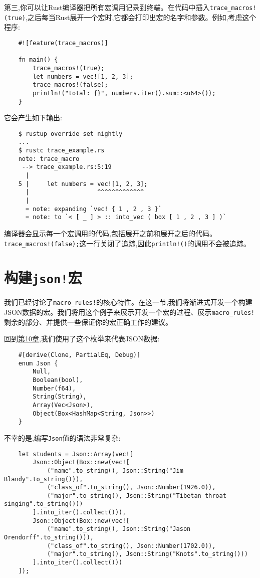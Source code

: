 第三,你可以让Rust编译器把所有宏调用记录到终端。在代码中插入\texttt{trace\_macros!(true)},之后每当Rust展开一个宏时,它都会打印出宏的名字和参数。例如,考虑这个程序:
\begin{verbatim}
    #![feature(trace_macros)]

    fn main() {
        trace_macros!(true);
        let numbers = vec![1, 2, 3];
        trace_macros!(false);
        println!("total: {}", numbers.iter().sum::<u64>());
    }
\end{verbatim}

它会产生如下输出:
\begin{verbatim}
    $ rustup override set nightly
    ...
    $ rustc trace_example.rs
    note: trace_macro
     --> trace_example.rs:5:19
      |
    5 |     let numbers = vec![1, 2, 3];
      |                   ^^^^^^^^^^^^^
      |
      = note: expanding `vec! { 1 , 2 , 3 }`
      = note: to `< [ _ ] > :: into_vec ( box [ 1 , 2 , 3 ] )`
\end{verbatim}
编译器会显示每一个宏调用的代码,包括展开之前和展开之后的代码。\texttt{trace\_macros!(false);}这一行关闭了追踪,因此\texttt{println!()}的调用不会被追踪。

\section{构建\texttt{json!}宏}

我们已经讨论了\texttt{macro\_rules!}的核心特性。在这一节,我们将渐进式开发一个构建JSON数据的宏。我们将用这个例子来展示开发一个宏的过程、展示\texttt{macro\_rules!}剩余的部分、并提供一些保证你的宏正确工作的建议。

回到\hyperref[ch10]{第10章},我们使用了这个枚举来代表JSON数据:
\begin{verbatim}
    #[derive(Clone, PartialEq, Debug)]
    enum Json {
        Null,
        Boolean(bool),
        Number(f64),
        String(String),
        Array(Vec<Json>),
        Object(Box<HashMap<String, Json>>)
    }
\end{verbatim}

不幸的是,编写\texttt{Json}值的语法非常复杂:
\begin{verbatim}
    let students = Json::Array(vec![
        Json::Object(Box::new(vec![
            ("name".to_string(), Json::String("Jim Blandy".to_string())),
            ("class_of".to_string(), Json::Number(1926.0)),
            ("major".to_string(), Json::String("Tibetan throat singing".to_string()))
        ].into_iter().collect())),
        Json::Object(Box::new(vec![
            ("name".to_string(), Json::String("Jason Orendorff".to_string())),
            ("class_of".to_string(), Json::Number(1702.0)),
            ("major".to_string(), Json::String("Knots".to_string()))
        ].into_iter().collect()))
    ]);
\end{verbatim}


